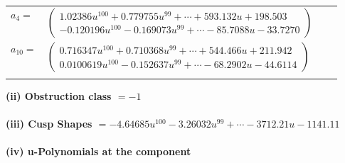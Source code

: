 \documentclass[1p]{elsarticle_modified}
\theoremstyle{definition}
\begin{document}
\begin{tabular}{m{7pt} m{180pt} m{7pt} m{180pt} }
\flushright $a_{4}=$&$\begin{pmatrix}1.02386 u^{100}+0.779755 u^{99}+\cdots+593.132 u+198.503\\-0.120196 u^{100}-0.169073 u^{99}+\cdots-85.7088 u-33.7270\end{pmatrix}$ \\
\flushright $a_{10}=$&$\begin{pmatrix}0.716347 u^{100}+0.710368 u^{99}+\cdots+544.466 u+211.942\\0.0100619 u^{100}-0.152637 u^{99}+\cdots-68.2902 u-44.6114\end{pmatrix}$\\&\end{tabular}
\flushleft \textbf{(ii) Obstruction class $= -1$}\\~\\
\flushleft \textbf{(iii) Cusp Shapes $= -4.64685 u^{100}-3.26032 u^{99}+\cdots-3712.21 u-1141.11$}\\~\\
\newpage\renewcommand{\arraystretch}{1}
\flushleft \textbf{(iv) u-Polynomials at the component}\newline \\
\end{document}
